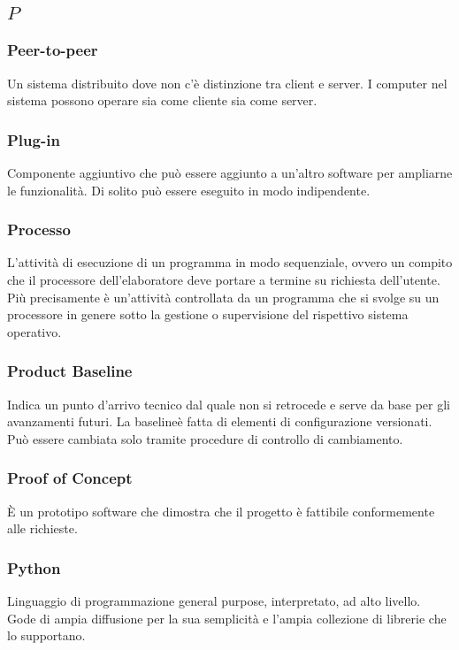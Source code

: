 \subsection*{\quad$P\quad$}
\subsubsection*{Peer-to-peer}
Un sistema distribuito dove non c'è distinzione tra client e server. I computer nel sistema possono operare sia come cliente sia come server. 

\subsubsection*{Plug-in}
Componente aggiuntivo che può essere aggiunto a un'altro software per ampliarne le funzionalità. Di solito può essere eseguito in modo indipendente.

\subsubsection*{Processo}
L'attività di esecuzione di un programma in modo sequenziale, ovvero un compito che il processore dell'elaboratore deve portare a termine su richiesta dell'utente. Più precisamente è un'attività controllata da un programma che si svolge su un processore in genere sotto la gestione o supervisione del rispettivo sistema operativo.

\subsubsection*{Product Baseline}
Indica un punto d’arrivo tecnico dal quale non si retrocede e serve da base per gli avanzamenti futuri. La baseline\glosp è fatta di elementi di configurazione versionati. Può essere cambiata solo tramite procedure di controllo di cambiamento.

\subsubsection*{Proof of Concept}
È un prototipo software che dimostra che il progetto è fattibile conformemente alle richieste.

\subsubsection*{Python}
Linguaggio di programmazione general purpose, interpretato, ad alto livello. Gode di ampia diffusione per la sua semplicità e l'ampia collezione di librerie che lo supportano.

